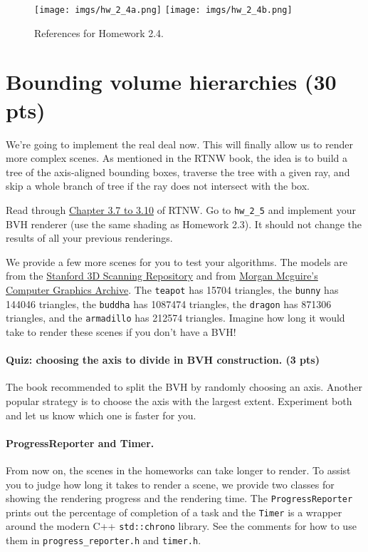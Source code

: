 \begin{figure}[ht]
    \centering
    \texttt{[image: imgs/hw\_2\_4a.png]}
    \texttt{[image: imgs/hw\_2\_4b.png]}
    \caption{References for Homework 2.4.}
    \label{fig:hw_2_4}
\end{figure}

\section{Bounding volume hierarchies (30 pts)}
We're going to implement the real deal now. This will finally allow us to render more complex scenes. As mentioned in the RTNW book, the idea is to build a tree of the axis-aligned bounding boxes, traverse the tree with a given ray, and skip a whole branch of tree if the ray does not intersect with the box. 

Read through \href{https://raytracing.github.io/books/RayTracingTheNextWeek.html#boundingvolumehierarchies/creatingboundingboxesoflistsofobjects}{Chapter 3.7 to 3.10} of RTNW. Go to \lstinline{hw_2_5} and implement your BVH renderer (use the same shading as Homework 2.3). It should not change the results of all your previous renderings.

We provide a few more scenes for you to test your algorithms. The models are from the \href{https://graphics.stanford.edu/data/3Dscanrep/}{Stanford 3D Scanning Repository} and from \href{https://casual-effects.com/data/}{Morgan Mcguire's Computer Graphics Archive}. The \lstinline{teapot} has 15704 triangles, the \lstinline{bunny} has 144046 triangles, the \lstinline{buddha} has 1087474 triangles, the \lstinline{dragon} has 871306 triangles, and the \lstinline{armadillo} has 212574 triangles. Imagine how long it would take to render these scenes if you don't have a BVH!

\paragraph{Quiz: choosing the axis to divide in BVH construction. (3 pts)} The book recommended to split the BVH by randomly choosing an axis. Another popular strategy is to choose the axis with the largest extent. Experiment both and let us know which one is faster for you.

\paragraph{ProgressReporter and Timer.} From now on, the scenes in the homeworks can take longer to render. To assist you to judge how long it takes to render a scene, we provide two classes for showing the rendering progress and the rendering time. The \lstinline{ProgressReporter} prints out the percentage of completion of a task and the \lstinline{Timer} is a wrapper around the modern C++ \lstinline{std::chrono} library. See the comments for how to use them in \lstinline{progress_reporter.h} and \lstinline{timer.h}.

